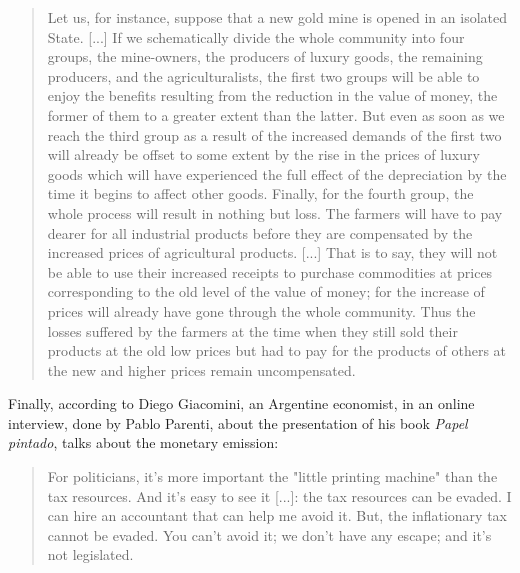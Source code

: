 \documentclass[12pt,a4paper,twoside]{book}
\begin{document}
\begin{quotation}
Let us, for instance, suppose that a new gold mine is opened in an isolated State. [...] If we schematically divide the whole community into four groups, the mine-owners, the producers of luxury goods, the remaining producers, and the agriculturalists, the first two groups will be able to enjoy the benefits resulting from the reduction in the value of money, the former of them to a greater extent than the latter. But even as soon as we reach the third group as a result of the increased demands of the first two will already be offset to some extent by the rise in the prices of luxury goods which will have experienced the full effect of the depreciation by the time it begins to affect other goods. Finally, for the fourth group, the whole process will result in nothing but loss. The farmers will have to pay dearer for all industrial products before they are compensated by the increased prices of agricultural products. [...] That is to say, they will not be able to use their increased receipts to purchase commodities at prices corresponding to the old level of the value of money; for the increase of prices will already have gone through the whole community. Thus the losses suffered by the farmers at the time when they still sold their products at the old low prices but had to pay for the products of others at the new and higher prices remain uncompensated. \cite[pp. 206-209]{mises:theomoney}
\end{quotation}

Finally, according to Diego Giacomini, an Argentine economist, in an online interview, done by Pablo Parenti, about the presentation of his book \textit{Papel pintado}, talks about the monetary emission:

\begin{quotation}
For politicians, it's more important the "little printing machine" than the tax resources. And it's easy to see it [...]: the tax resources can be evaded. I can hire an accountant that can help me avoid it. But, the inflationary tax cannot be evaded. You can't avoid it; we don't have any escape; and it's not legislated. \cite[TC. 00:12:16]{giacomini:emision}
\end{quotation}
\end{document}
